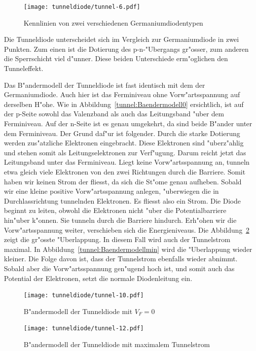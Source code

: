\begin{refsection}
\begin{figure}	%
\centering
\texttt{[image: tunneldiode/tunnel-6.pdf]}
\caption{Kennlinien von zwei verschiedenen Germaniumdiodentypen
\label{tunnel:Germaniumdioden}}
\end{figure}

Die Tunneldiode unterscheidet sich im Vergleich zur Germaniumdiode in zwei Punkten. 
Zum einen ist die Dotierung des p-n-"Ubergangs gr"osser, zum anderen die Sperrschicht viel d"unner. 
Diese beiden Unterschiede erm"oglichen den Tunneleffekt.

Das B"andermodell der Tunneldiode ist fast identisch mit dem der Germaniumdiode. 
Auch hier ist das Ferminiveau ohne Vorw"artsspannung auf derselben H"ohe. 
Wie in Abbildung~\ref{tunnel:Baendermodell0} ersichtlich, ist auf der p-Seite sowohl das Valenzband als auch das Leitungsband "uber dem Ferminiveau. 
Auf der n-Seite ist es genau umgekehrt, da sind beide B"ander unter dem Ferminiveau.
Der Grund daf"ur ist folgender.
Durch die starke Dotierung werden zus"atzliche Elektronen eingebracht.
Diese Elektronen sind "uberz"ahlig und stehen somit als Leitungselektronen zur Verf"ugung.
Darum reicht jetzt das Leitungsband unter das Ferminiveau.
Liegt keine Vorw"artsspannung an, tunneln etwa gleich viele Elektronen von den zwei Richtungen durch die Barriere.
Somit haben wir keinen Strom der fliesst, da sich die St"ome genau aufheben.
Sobald wir eine kleine positive Vorw"artsspannung anlegen, "uberwiegen die in Durchlassrichtung tunnelnden Elektronen.
Es fliesst also ein Strom.
Die Diode beginnt zu leiten, obwohl die Elektronen nicht "uber die Potentialbarriere hin"uber k"onnen. 
Sie tunneln durch die Barriere hindurch.
Erh"ohen wir die Vorw"artsspannung weiter, verschieben sich die Energieniveaus.
Die Abbildung~\ref{tunnel:Baendermodellmax} zeigt die gr"osste "Uberlappung. 
In diesem Fall wird auch der Tunnelstrom maximal. 
In Abbildung~\ref{tunnel:Baendermodellmin} wird die "Uberlappung wieder kleiner. 
Die Folge davon ist, dass der Tunnelstrom ebenfalls wieder abnimmt.
Sobald aber die Vorw"artsspannung gen"ugend hoch ist, und somit auch das Potential der Elektronen, setzt die normale Diodenleitung ein.

\begin{figure}	%
\centering
\texttt{[image: tunneldiode/tunnel-10.pdf]}
\caption{B"andermodell der Tunneldiode mit $V_F = 0$
\label{tunnel:Baendermodell0}}

\centering
\texttt{[image: tunneldiode/tunnel-12.pdf]}
\caption{B"andermodell der Tunneldiode mit maximalem Tunnelstrom
\label{tunnel:Baendermodellmax}}


\end{figure}
\end{refsection}
